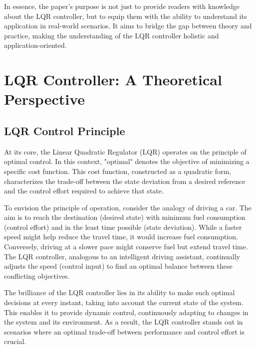\documentclass[11pt,twocolumn,twoside,lineno]{pnas-new}
\begin{document}
In essence, the paper's purpose is not just to provide readers with knowledge about the LQR controller, but to equip them with the ability to understand its application in real-world scenarios. It aims to bridge the gap between theory and practice, making the understanding of the LQR controller holistic and application-oriented.

\section*{LQR Controller: A Theoretical Perspective}

\subsection*{LQR Control Principle}

At its core, the Linear Quadratic Regulator (LQR) operates on the principle of optimal control. In this context, "optimal" denotes the objective of minimizing a specific cost function. This cost function, constructed as a quadratic form, characterizes the trade-off between the state deviation from a desired reference and the control effort required to achieve that state.

To envision the principle of operation, consider the analogy of driving a car. The aim is to reach the destination (desired state) with minimum fuel consumption (control effort) and in the least time possible (state deviation). While a faster speed might help reduce the travel time, it would increase fuel consumption. Conversely, driving at a slower pace might conserve fuel but extend travel time. The LQR controller, analogous to an intelligent driving assistant, continually adjusts the speed (control input) to find an optimal balance between these conflicting objectives.

The brilliance of the LQR controller lies in its ability to make such optimal decisions at every instant, taking into account the current state of the system. This enables it to provide dynamic control, continuously adapting to changes in the system and its environment. As a result, the LQR controller stands out in scenarios where an optimal trade-off between performance and control effort is crucial.


\showmatmethods{} %


\showacknow{} %


\end{document}
